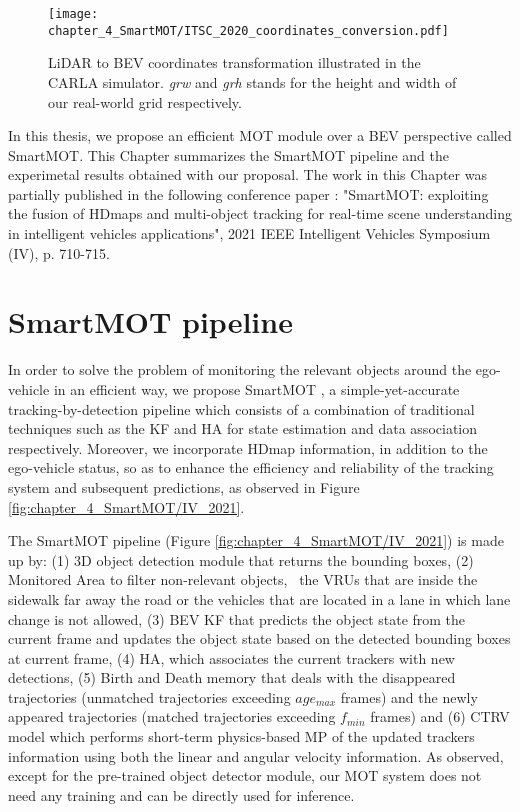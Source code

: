 \begin{figure}[h]
	\centering
	\captionsetup{justification=justified}
	\texttt{[image: chapter\_4\_SmartMOT/ITSC\_2020\_coordinates\_conversion.pdf]}
	\caption[LiDAR to BEV coordinates transformation illustrated in the CARLA simulator]{\ac{LiDAR} to \ac{BEV} coordinates transformation illustrated in the CARLA simulator. \textit{grw} and \textit{grh} stands for the height and width of our real-world grid respectively.}
	\label{fig:chapter_4_SmartMOT/ITSC_2020_coordinates_conversion}
\end{figure}

In this thesis, we propose an efficient \ac{MOT} module over a \ac{BEV} perspective called SmartMOT. This Chapter summarizes the SmartMOT pipeline and the experimetal results obtained with our proposal. The work in this Chapter was partially published in the following conference paper \cite{gomez2021smartmot}: "SmartMOT: exploiting the fusion of \acp{HDmap} and multi-object tracking for real-time scene understanding in intelligent vehicles applications", 2021 IEEE Intelligent Vehicles Symposium (IV), p. 710-715. 

\section{SmartMOT pipeline}
\label{sec:4_smartmot}

In order to solve the problem of monitoring the relevant objects around the ego-vehicle in an efficient way, we propose SmartMOT \cite{gomez2021smartmot}, a simple-yet-accurate tracking-by-detection pipeline which consists of a combination of traditional techniques such as the \ac{KF} \cite{kalman1960new} and \ac{HA} \cite{kuhn1955hungarian} for state estimation and data association respectively. Moreover, we incorporate \ac{HDmap} information, in addition to the ego-vehicle status, so as to enhance the efficiency and reliability of the tracking system and subsequent predictions, as observed in Figure \ref{fig:chapter_4_SmartMOT/IV_2021}. 

The SmartMOT pipeline (Figure \ref{fig:chapter_4_SmartMOT/IV_2021}) is made up by: (1) 3D object detection module that returns the bounding boxes, (2) Monitored Area to filter non-relevant objects, \eg \ the \acfp{VRU} that are inside the sidewalk far away the road or the vehicles that are located in a lane in which lane change is not allowed, (3) \acf{BEV} \acf{KF} that predicts the object state from the current frame and updates the object state based on the detected bounding boxes at current frame, (4) \acf{HA}, which associates the current trackers with new detections, (5) Birth and Death memory that deals with the disappeared trajectories (unmatched trajectories exceeding ${age_{max}}$ frames) and the newly appeared trajectories (matched trajectories exceeding ${f_{min}}$ frames) and (6) \ac{CTRV} model which performs short-term physics-based \ac{MP} of the updated trackers information using both the linear and angular velocity information. As observed, except for the pre-trained object detector module, our \ac{MOT} system does not need any training and can be directly used for inference.

